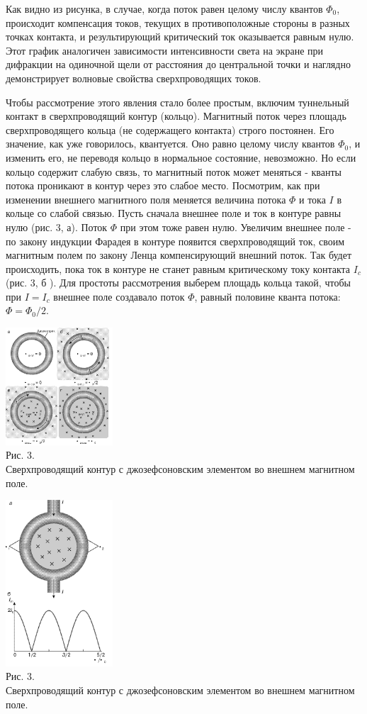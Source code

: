 \documentclass[a4paper,14pt]{article}
\begin{document}
Как видно из рисунка, в случае, когда поток равен целому числу квантов $\Phi_0$, происходит компенсация токов, текущих в противоположные стороны в разных точках контакта, и результирующий критический ток оказывается равным нулю. Этот график аналогичен зависимости интенсивности света на экране при дифракции на одиночной щели от расстояния до центральной точки и наглядно демонстрирует волновые свойства сверхпроводящих токов.

Чтобы рассмотрение этого явления стало более простым, включим туннельный контакт в сверхпроводящий контур (кольцо). Магнитный поток через площадь сверхпроводящего кольца (не содержащего контакта) строго постоянен. Его значение, как уже говорилось, квантуется. Оно равно целому числу квантов $\Phi_0$, и изменить его, не переводя кольцо в нормальное состояние, невозможно. Но если кольцо содержит слабую связь, то магнитный поток может меняться - кванты потока проникают в контур через это слабое место. 
Посмотрим, как при изменении внешнего магнитного поля меняется величина потока $\Phi$ и тока $I$ в кольце со слабой связью. Пусть сначала внешнее поле и ток в контуре равны нулю (рис. 3, а). Поток $\Phi$ при этом тоже равен нулю. Увеличим внешнее поле - по закону индукции Фарадея в контуре появится сверхпроводящий ток, своим магнитным полем по закону Ленца компенсирующий внешний поток. Так будет происходить, пока ток в контуре не станет равным критическому току контакта $I_c$ (рис. 3, б ). Для простоты рассмотрения выберем площадь кольца такой, чтобы при $I = I_c$ внешнее поле создавало поток $\Phi$, равный половине кванта потока: $\Phi = \Phi_0 / 2$.
\begin{center}
	\includegraphics[width=0.3\textwidth]{4_9_2}\\
	Рис. 3.\\
	Сверхпроводящий контур с джозефсоновским элементом во внешнем магнитном поле.
\end{center}
\begin{center}
	\includegraphics[width=0.3\textwidth]{4_9_3}\\
	Рис. 3.\\
	Сверхпроводящий контур с джозефсоновским элементом во внешнем магнитном поле.
\end{center}
\end{document}
